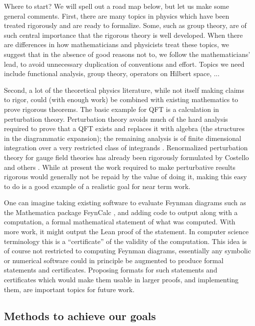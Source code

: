 \documentclass{article}
\begin{document}
Where to start?  We will spell out a road map below, but let us make some general comments.
First, there are many topics in physics which have been treated rigorously and are ready to formalize.  Some, such as group theory, are of such central importance that the rigorous theory is well developed.   When there are differences in how mathematicians and physicists treat these topics, we suggest that in the absence of good reasons not to, we follow the mathematicians' lead, to avoid unnecessary duplication of conventions and effort.  
Topics we need include functional analysis, group theory, operators on Hilbert space, ...

Second, a lot of the theoretical physics literature, while not itself making claims to rigor, could (with enough work) be combined with existing mathematics to prove rigorous theorems.  The basic example for QFT is a calculation in perturbation theory.  Perturbation theory avoids much of the hard analysis required to prove that a QFT exists and replaces it with algebra (the structures in the diagrammatic expansion); the remaining analysis is of finite dimensional integration over a very restricted class of integrands \cite{}.  Renormalized perturbation theory for gauge field theories has already been rigorously formulated by Costello and others \cite{}.  While at present the work required to  make perturbative results rigorous would generally not be repaid by the value of doing it, making this easy to do is a good example of a realistic goal for near term work.

One can imagine taking existing software to evaluate Feynman diagrams such as the Mathematica package FeynCalc \cite{},
and adding code to output along with a computation, a formal mathematical statement
of what was computed.  With more work, it might output the Lean proof of the statement.  In computer science terminology this is a ``certificate'' of the validity of the computation.  This idea is of course not restricted to computing Feynman diagrams, essentially any symbolic or numerical software could in principle be augmented to produce formal statements and certificates.  Proposing formats for such statements and certificates which would make them usable in larger proofs, and implementing them, are important topics for future work.

\subsection{Methods to achieve our goals}
\end{document}
